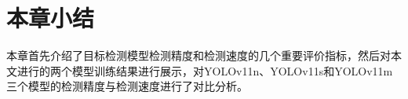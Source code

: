 





\section{本章小结}
本章首先介绍了目标检测模型检测精度和检测速度的几个重要评价指标，然后对本文进行的两个模型训练结果进行展示，对YOLOv11n、YOLOv11s和YOLOv11m三个模型的检测精度与检测速度进行了对比分析。



